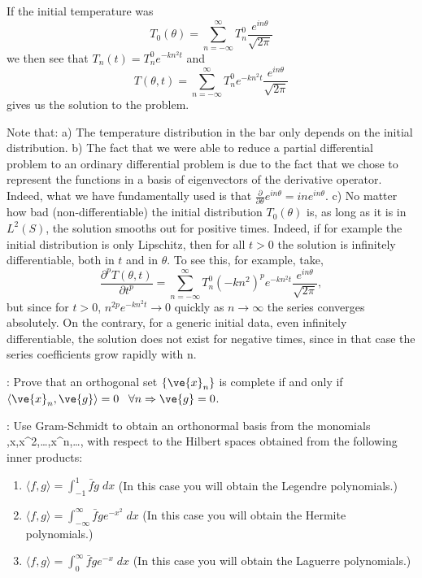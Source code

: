 If the initial temperature was 
\begin{equation}
  T_0(\theta) = \sum^{\infty}_{n=-\infty} T_n^0 \frac{e^{in\theta}}{\sqrt{2\pi}}
\end{equation}
%
we then see that $T_n(t) = T_n^0 e^{-kn^2t}$ and
\begin{equation}
  \label{eq:T_fourier_solucion}
  T(\theta,t) = \sum^{\infty}_{n=-\infty} T_n^0 e^{-kn^2t} \frac{e^{in\theta}}{\sqrt{2\pi}}
\end{equation}
%
gives us the solution to the problem.

Note that: 
a) The temperature distribution in the bar only depends on
the initial distribution. 
%
b) The fact that we were able to reduce a partial differential problem to an ordinary differential problem is due to the fact that we chose to represent the functions in a basis of eigenvectors of the derivative operator. Indeed, what
we have fundamentally used is that 
$\frac{\partial}{\partial \theta} e^{in\theta} = in e^{in\theta}$.
%
c) No matter how bad (non-differentiable) the 
initial distribution $T_0(\theta)$ is, as long as it is in $L^2(S)$, the solution smooths out for positive times. Indeed, if for example the initial distribution is only Lipschitz, then for all $t > 0$ the solution 
is infinitely differentiable, both in $t$ and in $\theta$. 
To see this, for example, take,
\begin{equation}
   \frac{\partial^pT(\theta,t)}{\partial t^p}  
   = \sum^{\infty}_{n=-\infty} T_n^0 (-kn^2)^p e^{-kn^2t} \frac{e^{in\theta}}{\sqrt{2\pi}},
\end{equation}
%
but since for $t>0$, $n^{2p} e^{-kn^2t} \to 0$ quickly as $n \to \infty$ the series converges absolutely. On the contrary, for a generic initial data, even infinitely differentiable, the solution does not exist for negative times, since in that case the series coefficients grow rapidly
with n. 


\ejer: Prove that an orthogonal set $\{\ve{x}_n\}$ is complete 
if and only if
$\langle \ve{x}_n,\ve{g}\rangle =  0 \;\;\; \forall n \Rightarrow \ve{g}=0$.
\espa

\bpro:
Use Gram-Schmidt to obtain an orthonormal basis from
the monomials 
,\;x,\;x^2,\;\ldots,x^n,\ldots,
\eeq
with respect to the Hilbert spaces obtained from the following
inner products:
\begin{enumerate}
\item $\langle f,g \rangle = \int^1_{-1} \bar fg \;dx$ (In this case you will obtain the
Legendre polynomials.)

\item $\langle f,g \rangle = \int^{\infty}_{-\infty} \bar f g e^{-x^2} \;dx$
(In this case you will obtain the Hermite polynomials.)

\item $\langle f,g \rangle = \int^{\infty}_0 \bar f g e^{-x}\; dx$
(In this case you will obtain the Laguerre polynomials.)

\end{enumerate}

